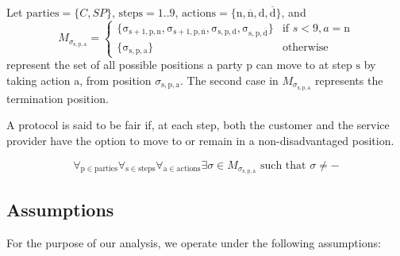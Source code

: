\documentclass[pdftex,twocolumn,epjc3]{svjour3}
\newcommand{\normal}{\mathrm{n}}
\newcommand{\dispute}{\mathrm{d}}
\newcommand{\abnormal}{\overline{\mathrm{n}}}
\newcommand{\abdispute}{\overline{\mathrm{d}}}
\begin{document}
\begin{definition}[Fairness] \label{def:fairness}
Let $\mathrm{parties} = \{ C, SP \}$, $\mathrm{steps} = 1..9$, $\mathrm{actions} = \{ \normal{}, \abnormal{}, \dispute{}, \abdispute{} \}$, and 
\[
M_{\sigma_\mathrm{s,p,a}} = 
\begin{cases} 
\{ \mathrm{\sigma_{s+1,p,\normal}}, \mathrm{\sigma_{s+1,p,\abnormal}}, \mathrm{\sigma_{s,p,\dispute}}, \mathrm{\sigma_{s,p,\abdispute}} \} & \text{if } s < 9, a = \normal{} \\
\{ \mathrm{\sigma_{s,p,a}} \} & \text{otherwise} 
\end{cases}
\]
represent the set of all possible positions a party $\mathrm{p}$ can move to at step $\mathrm{s}$ by taking action $\mathrm{a}$, from position $\sigma_\mathrm{s,p,a}$. The second case in $M_{\sigma_\mathrm{s,p,a}}$ represents the termination position.

A protocol is said to be fair if, at each step, both the customer and the service provider have the option to move to or remain in a non-disadvantaged position.

\begin{equation}
\forall_{\mathrm{p} \in \mathrm{parties}} \forall_{\mathrm{s} \in \mathrm{steps}} \forall_{\mathrm{a} \in \mathrm{actions}} \exists \sigma \in M_{\sigma_\mathrm{s, p, a}} \text{ such that } \sigma \neq -
\end{equation}
\end{definition}


\subsection{Assumptions}\label{sec:assumptions}

For the purpose of our analysis, we operate under the following assumptions:
\end{document}
